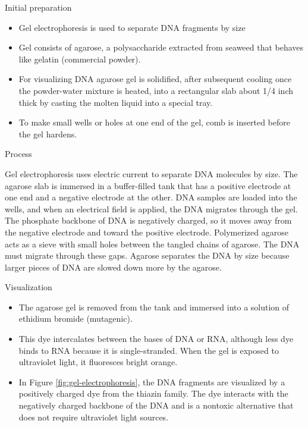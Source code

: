 \documentclass[ignorenonframetext,aspectratio=169]{beamer}
\providecommand{\tightlist}{%
  \setlength{\itemsep}{0pt}\setlength{\parskip}{0pt}}
\begin{document}
\begin{frame}{Initial preparation}
\protect\hypertarget{initial-preparation}{}

\begin{itemize}
\tightlist
\item
  Gel electrophoresis is used to separate DNA fragments by size
\item
  Gel consists of agarose, a polysaccharide extracted from seaweed that
  behaves like gelatin (commercial powder).
\item
  For visualizing DNA agarose gel is solidified, after subsequent
  cooling once the powder-water mixture is heated, into a rectangular
  slab about 1/4 inch thick by casting the molten liquid into a special
  tray.
\item
  To make small wells or holes at one end of the gel, comb is inserted
  before the gel hardens.
\end{itemize}

\end{frame}

\begin{frame}{Process}
\protect\hypertarget{process}{}

Gel electrophoresis uses electric current to separate DNA molecules by
size. The agarose slab is immersed in a buffer-filled tank that has a
positive electrode at one end and a negative electrode at the other. DNA
samples are loaded into the wells, and when an electrical field is
applied, the DNA migrates through the gel. The phosphate backbone of DNA
is negatively charged, so it moves away from the negative electrode and
toward the positive electrode. Polymerized agarose acts as a sieve with
small holes between the tangled chains of agarose. The DNA must migrate
through these gaps. Agarose separates the DNA by size because larger
pieces of DNA are slowed down more by the agarose.

\end{frame}

\begin{frame}{Visualization}
\protect\hypertarget{visualization}{}

\begin{itemize}
\tightlist
\item
  The agarose gel is removed from the tank and immersed into a solution
  of ethidium bromide (mutagenic).
\item
  This dye intercalates between the bases of DNA or RNA, although less
  dye binds to RNA because it is single-stranded. When the gel is
  exposed to ultraviolet light, it fluoresces bright orange.
\item
  In Figure \ref{fig:gel-electrophoresis}, the DNA fragments are
  visualized by a positively charged dye from the thiazin family. The
  dye interacts with the negatively charged backbone of the DNA and is a
  nontoxic alternative that does not require ultraviolet light sources.
\end{itemize}

\end{frame}
\end{document}
